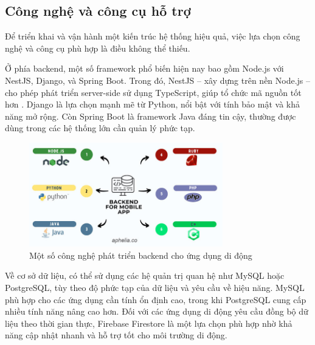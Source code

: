     \subsection{Công nghệ và công cụ hỗ trợ}
    \renewcommand{\labelitemi}{--}
    \begin{flushleft}
        \hspace*{0.8cm}Để triển khai và vận hành một kiến trúc hệ thống hiệu quả, việc lựa chọn công nghệ và công cụ phù hợp là điều không thể thiếu.
      \end{flushleft}

      \begin{flushleft}
        \hspace*{0.8cm}Ở phía backend, một số framework phổ biến hiện nay bao gồm Node.js với NestJS, Django, và Spring Boot. Trong đó, NestJS – xây dựng trên nền Node.js – cho phép phát triển server-side sử dụng TypeScript, giúp tổ chức mã nguồn tốt hơn \cite{backendframeworks}. Django là lựa chọn mạnh mẽ từ Python, nổi bật với tính bảo mật và khả năng mở rộng. Còn Spring Boot là framework Java đáng tin cậy, thường được dùng trong các hệ thống lớn cần quản lý phức tạp.
      \end{flushleft}

      \begin{figure}[h]
        \centering
        \includegraphics[width=0.75\textwidth]{images/backend_for_mobile_app.jpg}
        \caption{Một số công nghệ phát triển backend cho ứng dụng di động}
        \label{fig:fig1}
      \end{figure}

      \begin{flushleft}
        \hspace*{0.8cm}Về cơ sở dữ liệu, có thể sử dụng các hệ quản trị quan hệ như MySQL hoặc PostgreSQL, tùy theo độ phức tạp của dữ liệu và yêu cầu về hiệu năng. MySQL phù hợp cho các ứng dụng cần tính ổn định cao, trong khi PostgreSQL cung cấp nhiều tính năng nâng cao hơn. Đối với các ứng dụng di động yêu cầu đồng bộ dữ liệu theo thời gian thực, Firebase Firestore là một lựa chọn phù hợp nhờ khả năng cập nhật nhanh và hỗ trợ tốt cho môi trường di động.
      \end{flushleft}

